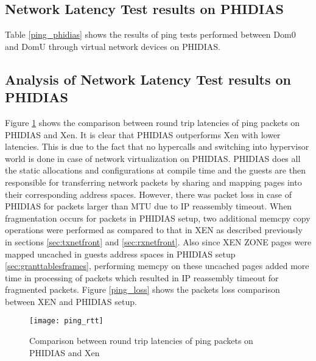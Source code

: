 \subsection{Network Latency Test results on PHIDIAS \label{sec:testlatencyphidias}}
Table \ref{ping_phidias} shows the results of ping tests performed between Dom0 and DomU through virtual network devices on PHIDIAS.

\begin{table}[htbp]
	\caption{Ping Test Results on PHIDIAS}
	 \centering
	\label{ping_phidias}
\end{table}

\subsection{Analysis of Network Latency Test results on PHIDIAS \label{sec:testlatencyeval}}

Figure \ref{ping_rtt} shows the comparison between round trip latencies of ping packets on PHIDIAS and Xen. It is clear that PHIDIAS outperforms Xen with lower latencies. This is due to the fact that no hypercalls and switching into hypervisor world is done in case of network virtualization on PHIDIAS. PHIDIAS does all the static allocations and configurations at compile time and the guests are then responsible for transferring network packets by sharing and mapping pages into their corresponding address spaces. However, there was packet loss in case of PHIDIAS for packets larger than MTU due to IP reassembly timeout. When fragmentation occurs for packets in PHIDIAS setup, two additional memcpy copy operations were performed as compared to that in XEN as described previously in sections \ref{sec:txnetfront} and \ref{sec:rxnetfront}. Also since XEN ZONE pages were mapped uncached in guests address spaces in PHIDIAS setup \ref{sec:granttablesframes}, performing memcpy on these uncached pages added more time in processing of packets which resulted in IP reassembly timeout for fragmented packets. Figure \ref{ping_loss} shows the packets loss comparison between XEN and PHIDIAS setup.
\begin{figure}[!htbp]
	\centering
	\texttt{[image: ping\_rtt]}
	\caption{Comparison between round trip latencies of ping packets on PHIDIAS and Xen}
	\label{ping_rtt}
\end{figure}


